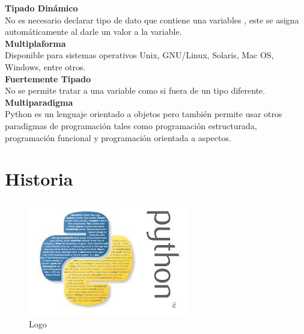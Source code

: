 \documentclass[11pt]{article} %
\begin{document}
\textbf{Tipado Dinámico}
\\    No es necesario declarar tipo de dato que contiene una variables , este se asigna automáticamente al darle un valor a la variable.\\

\textbf{Multiplaforma}
\\   Disponible para sistemas operativos Unix, GNU/Linux, Solaris, Mac OS, Windows, entre otros.\\

\textbf{Fuertemente Tipado}
\\   No se permite tratar a una variable como si fuera de un tipo diferente.\\

\textbf{Multiparadigma}
\\   Python es un lenguaje orientado a objetos pero también permite usar otros paradigmas de programación tales como programación estructurada, programación funcional y programación orientada a aspectos.\\

\section{Historia}
\begin{figure}[htbp]
	\begin{center}
		\includegraphics[width=.60\textwidth]{./imagenes/python.png}
		\caption{Logo}
		\label{Logo}
	\end{center}
\end{figure}
\end{document}
